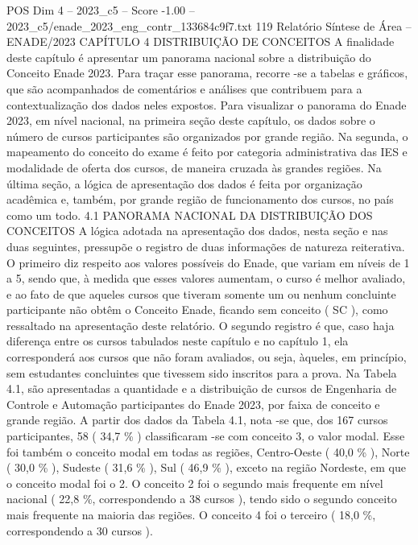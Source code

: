 \begin{textsample}{POS Dim 4 – 2023\_c5 – Score -1.00 – 2023\_c5/enade\_2023\_eng\_contr\_133684c9f7.txt}  \label{ex:f4_pos_275}
119 Relatório Síntese de Área – ENADE/2023 CAPÍTULO 4 DISTRIBUIÇÃO DE CONCEITOS A finalidade deste capítulo é apresentar um panorama nacional sobre a distribuição do Conceito Enade 2023.
Para traçar esse panorama, recorre -se a tabelas e gráficos, que são acompanhados de comentários e análises que contribuem para a contextualização dos dados neles expostos.
Para visualizar o panorama do Enade 2023, em nível nacional, na primeira seção deste capítulo, os dados sobre o número de cursos participantes são organizados por grande região.
Na segunda, o mapeamento do conceito do exame é feito por categoria administrativa das IES e modalidade de oferta dos cursos, de maneira cruzada às grandes regiões.
Na última seção, a lógica de apresentação dos dados é feita por organização acadêmica e, também, por grande região de funcionamento dos cursos, no país como um todo. 4.1 PANORAMA NACIONAL DA DISTRIBUIÇÃO DOS CONCEITOS A lógica adotada na apresentação dos dados, nesta seção e nas duas seguintes, pressupõe o registro de duas informações de natureza reiterativa.
O primeiro diz respeito aos valores possíveis do Enade, que variam em níveis de 1 a 5, sendo que, à medida que esses valores aumentam, o curso é melhor avaliado, e ao fato de que aqueles cursos que tiveram somente um ou nenhum concluinte participante não obtêm o Conceito Enade, ficando sem conceito ( SC ), como ressaltado na apresentação deste relatório.
O segundo registro é que, caso haja diferença entre os cursos tabulados neste capítulo e no capítulo 1, ela corresponderá aos cursos que não foram avaliados, ou seja, àqueles, em princípio, sem estudantes concluintes que tivessem sido inscritos para a prova.
Na Tabela 4.1, são apresentadas a quantidade e a distribuição de cursos de Engenharia de Controle e Automação participantes do Enade 2023, por faixa de conceito e grande região.
A partir dos dados da Tabela 4.1, nota -se que, dos 167 cursos participantes, 58 ( 34,7 \% ) classificaram -se com conceito 3, o valor modal.
Esse foi também o conceito modal em todas as regiões, Centro-Oeste ( 40,0 \% ), Norte ( 30,0 \% ), Sudeste ( 31,6 \% ), Sul ( 46,9 \% ), exceto na região Nordeste, em que o conceito modal foi o 2.
O conceito 2 foi o segundo mais frequente em nível nacional ( 22,8 \%, correspondendo a 38 cursos ), tendo sido o segundo conceito mais frequente na maioria das regiões.
O conceito 4 foi o terceiro ( 18,0 \%, correspondendo a 30 cursos ).

\end{textsample}
